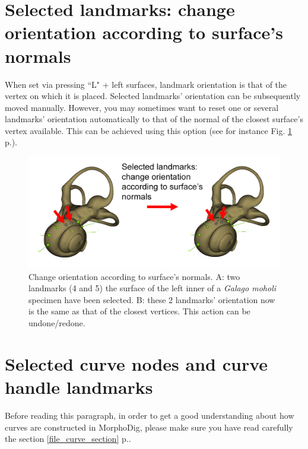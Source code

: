 \section{Selected landmarks: change orientation according to surface's normals}
When set via pressing ``L" + left surfaces, landmark orientation is that of the vertex on which it is
placed. Selected landmarks' orientation can be subsequently moved manually. However, you may
sometimes want to reset one or several landmarks' orientation automatically to that of the normal of the closest
surface's vertex available. This can be achieved using this option (see for instance Fig. \ref{reorient} p.\pageref{reorient}).

\begin{figure}
  \centering
  \includegraphics[scale=0.3]{images/10/reorient.png} 
	\caption{Change orientation according to surface's normals. A: two landmarks (4 and 5) the surface of the left inner of a \textit{Galago moholi} specimen have been selected. B: these 2 landmarks' orientation now is the same as that of the closest vertices. This action can be undone/redone.}
\label{reorient}
 
\end{figure}


\section{Selected curve nodes and curve handle landmarks}\label{landmarks_curves_section}
Before reading this paragraph, in order to get a good understanding  about how curves are constructed in MorphoDig, please make sure you have read carefully the section \ref{file_curve_section} p.\pageref{file_curve_section}.
